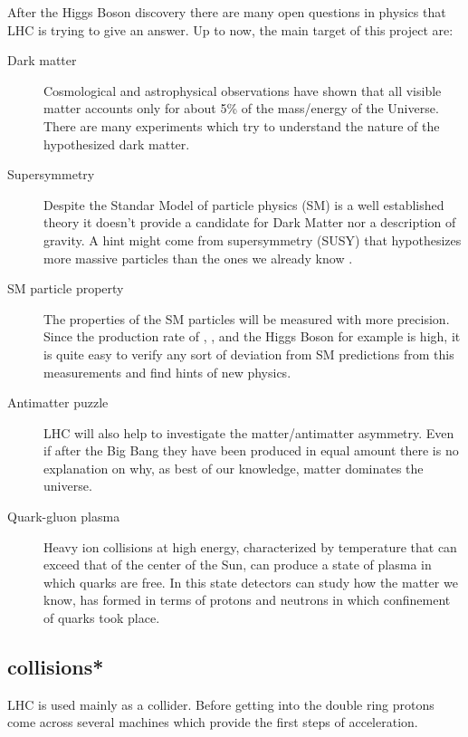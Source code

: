 After the Higgs Boson discovery there are many open questions in physics that LHC is trying to give an answer. Up to now, the main target of this project are:
\begin{description}
\item[Dark matter] Cosmological and astrophysical observations have shown that all visible matter accounts only for about 5\% of the mass/energy of the Universe. There are many experiments which try to understand the nature of the hypothesized dark matter.
\item[Supersymmetry] Despite the Standar Model of particle physics (SM) is a well established theory it doesn't provide a candidate for Dark Matter nor a description of gravity. A hint might come from supersymmetry (SUSY) that hypothesizes more massive particles than the ones we already know \cite{SSMPrimer}.
\item[SM particle property] The properties of the SM particles will be measured with more precision. Since the production rate of \Wboson, \Zboson, \ttbar and the Higgs Boson for example is high, it is quite easy to verify any sort of deviation from SM predictions from this measurements and find hints of new physics.
\item[Antimatter puzzle] LHC will also help to investigate the matter/antimatter asymmetry. Even if after the Big Bang they have been produced in equal amount there is no explanation on why, as best of our knowledge, matter dominates the universe.
\item[Quark-gluon plasma] Heavy ion collisions at high energy, characterized by temperature that can exceed that of the center of the Sun, can produce a state of plasma in which quarks are free. In this state detectors can study how the matter we know, has formed in terms of protons and neutrons in which confinement of quarks took place.
\end{description}

\subsection{\pp collisions*}
LHC is used mainly as a \pp collider. Before getting into the double ring protons come across several machines which provide the first steps of acceleration.

